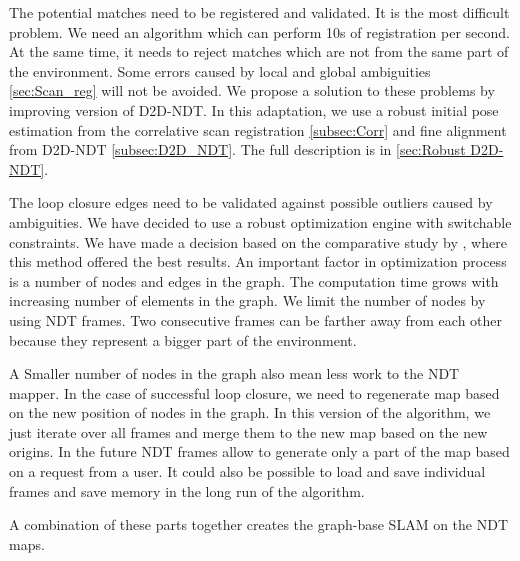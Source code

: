 The potential matches need to be registered and validated. It is the most difficult problem. We need an algorithm which can perform 10s of registration per second. At the same time, it needs to reject matches which are not from the same part of the environment.  Some errors caused by local and global ambiguities \ref{sec:Scan_reg} will not be avoided. We propose a solution to these problems by improving version of \gls{D2D}-\gls{NDT}. In this adaptation, we use a robust initial pose estimation from the correlative scan registration \ref{subsec:Corr} and fine alignment from \gls{D2D}-\gls{NDT} \ref{subsec:D2D_NDT}. The full description is in \ref{sec:Robust D2D-NDT}.

The loop closure edges need to be validated against possible outliers caused by ambiguities. We have decided to use a robust optimization engine with switchable constraints. We have made a decision based on the comparative study by \cite{RobustOpt}, where this method offered the best results. An important factor in optimization process is a number of nodes and edges in the graph. The computation time grows with increasing number of elements in the graph. We limit the number of nodes by using \gls{NDT} frames. Two consecutive frames can be farther away from each other because they represent a bigger part of the environment.

A Smaller number of nodes in the graph also mean less work to the \gls{NDT} mapper. In the case of successful loop closure, we need to regenerate map based on the new position of nodes in the graph. In this version of the algorithm, we just iterate over all frames and merge them to the new map based on the new origins. In the future \gls{NDT} frames allow to generate only a part of the map based on a request from a user. It could also be possible to load and save individual frames and save memory in the long run of the algorithm.

A combination of these parts together creates the graph-base \gls{SLAM} on the NDT maps.   

